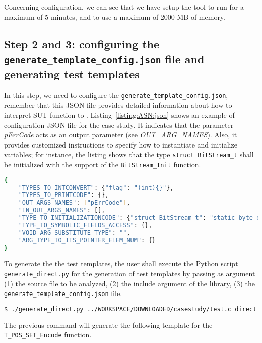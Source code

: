 Concerning \SEMU configuration, we can see that we have setup the tool to run for a maximum of 5 minutes, and to use a maximum of 2000 MB of memory.

\subsection{Step 2 and 3: configuring the \texttt{generate\_template\_config.json} file and generating test templates}

In this step, we need to configure the \texttt{generate\_template\_config.json}, remember that this JSON file provides detailed information about how to interpret SUT function to \SEMUS.
Listing~\ref{listing:ASN:json} shows an example of configuration JSON file for the case study. 
It indicates that the parameter \emph{pErrCode} acts as an output parameter (see \emph{OUT\_ARG\_NAMES}). 
Also, it provides customized instructions to specify how to instantiate and initialize variables; for instance, the listing shows that the type \texttt{struct BitStream\_t} shall be initialized with the support of the \texttt{BitStream\_Init} function.

\begin{lstlisting}[language=bash,label=listing:ASN:json,caption=JSON configuration file for ASN.1.]
{
    "TYPES_TO_INTCONVERT": {"flag": "(int){}"},
    "TYPES_TO_PRINTCODE": {},
    "OUT_ARGS_NAMES": ["pErrCode"],
    "IN_OUT_ARGS_NAMES": [],
    "TYPE_TO_INITIALIZATIONCODE": {"struct BitStream_t": "static byte encBuff[T_POS_SET_REQUIRED_BYTES_FOR_ENCODING + 1];\n\tBitStream_Init(&{}, encBuff, T_POS_SET_REQUIRED_BYTES_FOR_ENCODING)"},
    "TYPE_TO_SYMBOLIC_FIELDS_ACCESS": {},
    "VOID_ARG_SUBSTITUTE_TYPE": "",
    "ARG_TYPE_TO_ITS_POINTER_ELEM_NUM": {}
}
\end{lstlisting}

To generate the the test templates, the user shall execute the Python script \texttt{generate\_direct.py} for the generation of test templates by passing as argument (1) the source file to be analyzed, (2) the include argument of the library, (3) the \texttt{generate\_template\_config.json} file.

\begin{lstlisting}[language=bash]
$ ./generate_direct.py ../WORKSPACE/DOWNLOADED/casestudy/test.c direct " -I../WORKSPACE/DOWNLOADED/casestudy/" -c generate_template_config.json
\end{lstlisting}

The previous command will generate the following template for the \texttt{T\_POS\_SET\_Encode} function.

